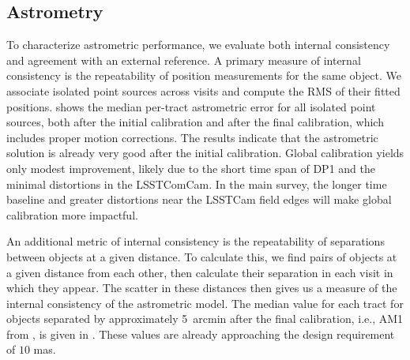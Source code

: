 \subsection{Astrometry}
To characterize astrometric performance, we evaluate both internal consistency and agreement with an external reference.
A primary measure of internal consistency is the repeatability of position measurements for the same object. We associate isolated point sources across visits and compute the \gls{RMS} of their fitted positions.
 shows the median per-\gls{tract} astrometric error for all isolated point sources, both after the initial calibration and after the final calibration, which includes proper motion corrections.
The results indicate that the astrometric solution is already very good after the initial \gls{calibration}.
Global calibration yields only modest improvement, likely due to the short time span of \gls{DP1} and the minimal distortions in the LSSTComCam.
In the main survey, the longer time baseline and greater distortions near the \gls{LSSTCam} field edges will make global calibration more impactful.

An additional \gls{metric} of internal consistency is the repeatability of separations between objects at a given distance.
To calculate this, we find pairs of objects at a given distance from each other, then calculate their separation in each visit in which they appear.
The scatter in these distances then gives us a measure of the internal consistency of the astrometric model.
The median value for each tract for objects separated by approximately 5~arcmin after the final calibration, i.e., AM1 from \citet{LPM-17}, is given in .
These values are already approaching the design requirement of $10$ mas.

